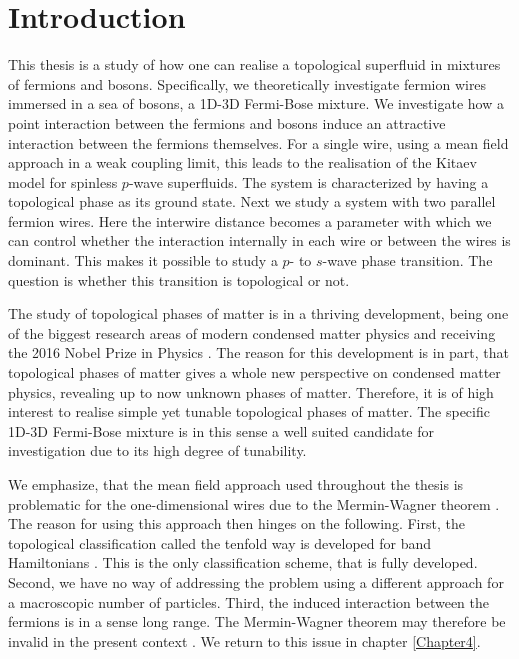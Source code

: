 
\chapter{Introduction} %

\label{Chapter1} %



This thesis is a study of how one can realise a topological superfluid in mixtures of fermions and bosons. Specifically, we theoretically investigate fermion wires immersed in a sea of bosons, a 1D-3D Fermi-Bose mixture. We investigate how a point interaction between the fermions and bosons induce an attractive interaction between the fermions themselves. For a single wire, using a mean field approach in a weak coupling limit, this leads to the realisation of the Kitaev model for spinless $p$-wave superfluids. The system is characterized by having a topological phase as its ground state. Next we study a system with two parallel fermion wires. Here the interwire distance becomes a parameter with which we can control whether the interaction internally in each wire or between the wires is dominant. This makes it possible to study a $p$- to $s$-wave phase transition. The question is whether this transition is topological or not. 

The study of topological phases of matter is in a thriving development, being one of the biggest research areas of modern condensed matter physics and receiving the 2016 Nobel Prize in Physics \cite{NobelPrize2016}. The reason for this development is in part, that topological phases of matter gives a whole new perspective on condensed matter physics, revealing up to now unknown phases of matter. Therefore, it is of high interest to realise simple yet tunable topological phases of matter. The specific 1D-3D Fermi-Bose mixture is in this sense a well suited candidate for investigation due to its high degree of tunability. 

We emphasize, that the mean field approach used throughout the thesis is problematic for the one-dimensional wires due to the Mermin-Wagner theorem \cite{Hohenberg.MerminWagnertheorem}. The reason for using this approach then hinges on the following. First, the topological classification called the tenfold way is developed for band Hamiltonians \cite{Ryu.Topology}. This is the only classification scheme, that is fully developed. Second, we have no way of addressing the problem using a different approach for a macroscopic number of particles. Third, the induced interaction between the fermions is in a sense long range. The Mermin-Wagner theorem may therefore be invalid in the present context \cite{Ortiz.Beyondmeanfieldtheory}. We return to this issue in chapter \ref{Chapter4}. 

